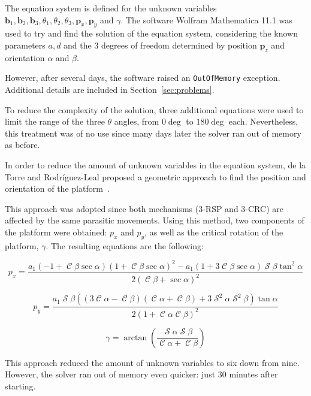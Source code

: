 \documentclass[titlepage, letterpaper]{article}
\DeclareMathOperator{\cose}{\mathcal{C}}
\DeclareMathOperator{\sen}{\mathcal{S}}
\begin{document}
The equation system is defined for the unknown variables $\mathbf{b}_1, \mathbf{b}_2, \mathbf{b}_3, \theta_1, \theta_2, \theta_3, \mathbf{p}_x, \mathbf{p}_y$ and $\gamma$.
The software Wolfram Mathematica 11.1 was used to try and find the solution of the equation system, considering the known parameters $a, d$ and the 3 degrees of freedom determined by position $\mathbf{p}_z$ and orientation $\alpha$ and $\beta$.

However, after several days, the software raised an \texttt{OutOfMemory} exception. Additional details are included in Section~\ref{sec:problems}.

To reduce the complexity of the solution, three additional equations were used to limit the range of the three $\theta$ angles, from $0\deg$ to $180\deg$ each.
Nevertheless, this treatment was of no use since many days later the solver ran out of memory as before.

In order to reduce the amount of unknown variables in the equation system, de la Torre and Rodríguez-Leal proposed a geometric approach to find the position and orientation of the platform~\cite{delaTorre2016}.

This approach was adopted since both mechanisms (3-RSP and 3-CRC) are affected by the same parasitic movements.
Using this method, two components of the platform were obtained: $p_x$ and $p_y$, as well as the critical rotation of the platform, $\gamma$.
The resulting equations are the following:

\begin{equation}
    \label{eq:px_3crc}
    p_x = \frac{a_1 (-1 + \cose \beta \sec \alpha)(1 + \cose \beta \sec \alpha)^2 - a_1 (1 + 3 \cose \beta \sec \alpha) \sen \beta \tan^2 \alpha}{2(\cose \beta + \sec \alpha)^2}    
\end{equation}

\begin{equation}
    p_y = \frac{a_1 \sen \beta((3 \cose \alpha - \cose \beta)(\cose \alpha + \cose \beta) + 3 \sen^2 \alpha \sen^2 \beta) \tan \alpha}{2(1 + \cose \alpha \cose \beta)^2}
\end{equation}

\begin{equation}
    \gamma = \arctan \left( \frac{\sen \alpha \sen \beta}{\cose \alpha + \cose \beta} \right)
\end{equation}

This approach reduced the amount of unknown variables to six down from nine.
However, the solver ran out of memory even quicker: just 30 minutes after starting.
\end{document}
